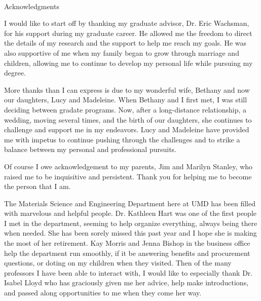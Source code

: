 

\renewcommand{\baselinestretch}{2}
\small\normalsize
\hbox{\ }

\vspace{-.65in}

\begin{center}
\large{Acknowledgments}
\end{center}

\vspace{1ex}

I would like to start off by thanking my graduate advisor, Dr. Eric Wachsman, for his support during my graduate career.
He allowed me the freedom to direct the details of my research and the support to help me reach my goals.
He was also supportive of  me when my family began to grow through marriage and children, allowing me to continue to develop my personal life while pursuing my degree.

More thanks than I can express is due to my wonderful wife, Bethany and now our daughters, Lucy and Madeleine.
When Bethany and I first met, I was still deciding between gradate programs.
Now, after a long-distance relationship, a wedding, moving several times, and the birth of our daughters, she continues to challenge and support me in my endeavors.
Lucy and Madeleine have provided me with impetus to continue pushing through the challenges and to strike a balance between my personal and professional pursuits.

Of course I owe acknowledgement to my parents, Jim and Marilyn Stanley, who raised me to be inquisitive and persistent.
Thank you for helping me to become the person that I am.

The Materials Science and Engineering Department here at UMD has been filled with marvelous and helpful people.
Dr. Kathleen Hart was one of the first people I met in the department, seeming to help organize everything, always being there when needed.
She has been sorely missed this past year and I hope she is making the most of her retirement.
Kay Morris and Jenna Bishop in the business office help the department run smoothly, if it be answering benefits and procurement questions, or doting on my children when they visited.
Then of the many professors I have been able to interact with, I would like to especially thank Dr. Isabel Lloyd who has graciously given me her advice, help make introductions, and passed along opportunities to me when they come her way.

